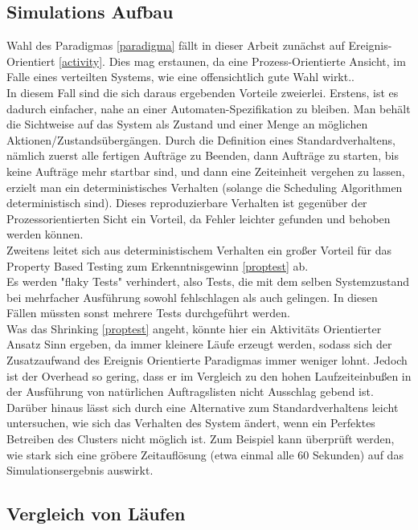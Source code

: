 \subsection{Simulations Aufbau}
Wahl des Paradigmas \ref{paradigma} fällt in dieser Arbeit zunächst auf Ereignis-Orientiert \ref{activity}. Dies mag erstaunen, da eine Prozess-Orientierte Ansicht, im Falle eines verteilten Systems, wie eine offensichtlich gute Wahl wirkt..\\
In diesem Fall sind die sich daraus ergebenden Vorteile zweierlei. Erstens, ist es dadurch einfacher, nahe an einer Automaten-Spezifikation zu bleiben. Man behält die Sichtweise auf das System als Zustand und einer Menge an möglichen Aktionen/Zustandsübergängen. Durch die Definition eines Standardverhaltens, nämlich zuerst alle fertigen Aufträge zu Beenden, dann Aufträge zu starten, bis keine Aufträge mehr startbar sind, und dann eine Zeiteinheit vergehen zu lassen, erzielt man ein deterministisches Verhalten (solange die Scheduling Algorithmen deterministisch sind). Dieses reproduzierbare Verhalten ist gegenüber der Prozessorientierten Sicht ein Vorteil, da Fehler leichter gefunden und behoben werden können.\\
Zweitens leitet sich aus deterministischem Verhalten ein großer Vorteil für das Property Based Testing zum Erkenntnisgewinn \ref{proptest} ab.\\
Es werden "flaky Tests" verhindert, also Tests, die mit dem selben Systemzustand bei mehrfacher Ausführung sowohl fehlschlagen als auch gelingen. In diesen Fällen müssten sonst mehrere Tests durchgeführt werden.\\
Was das Shrinking \ref{proptest} angeht, könnte hier ein  Aktivitäts Orientierter Ansatz Sinn ergeben, da immer kleinere Läufe erzeugt werden, sodass sich der Zusatzaufwand des Ereignis Orientierte Paradigmas immer weniger lohnt. Jedoch ist der Overhead so gering, dass er im Vergleich zu den hohen Laufzeiteinbußen in der Ausführung von natürlichen Auftragslisten nicht Ausschlag gebend ist.\\
Darüber hinaus lässt sich durch eine Alternative zum Standardverhaltens leicht untersuchen, wie sich das Verhalten des System ändert, wenn ein Perfektes Betreiben des Clusters nicht möglich ist. Zum Beispiel kann überprüft werden, wie stark sich eine gröbere Zeitauflösung (etwa einmal alle 60 Sekunden) auf das Simulationsergebnis auswirkt.


\subsection{Vergleich von Läufen}
\label{vergleich}
